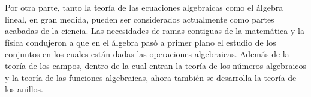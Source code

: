 Por otra parte, tanto la teoría de las ecuaciones algebraicas como el álgebra lineal, en gran medida, pueden ser considerados actualmente como partes acabadas de la ciencia. Las necesidades de ramas contiguas de la matemática y la física condujeron a que en el álgebra pasó a primer plano el estudio de los conjuntos en los cuales están dadas las operaciones algebraicas. Además de la teoría de los campos, dentro de la cual entran la teoría de los números algebraicos y la teoría de las funciones algebraicas, ahora también se desarrolla la teoría de los anillos.